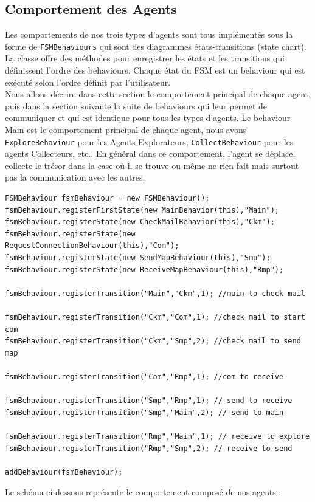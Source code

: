 \documentclass[10pt]{article}
\newcommand\tab[1][0.65cm]{\hspace*{#1}}
\begin{document}
	\subsection{Comportement des Agents}
	Les comportements de nos trois types d'agents sont tous implémentés sous la forme de \texttt{FSMBehaviours} qui sont des diagrammes états-transitions (state chart). La classe offre des méthodes pour enregistrer les états et les transitions qui définissent l'ordre des behaviours.	Chaque état du FSM est un behaviour qui est exécuté selon l'ordre définit par l'utilisateur.\\
	\tab Nous allons décrire dans cette section le comportement principal de chaque agent, puis dans la section suivante la suite de behaviours qui leur permet de communiquer et qui est identique pour tous les types d'agents. Le behaviour Main est le comportement principal de chaque agent, nous avons \texttt{ExploreBehaviour} pour les Agents Explorateurs, \texttt{CollectBehaviour} pour les agents Collecteurs, etc.. En général dans ce comportement, l'agent se déplace, collecte le trésor dans la case où il se trouve ou même ne rien fait mais surtout pas la communication avec les autres.

\begin{lstlisting}
FSMBehaviour fsmBehaviour = new FSMBehaviour();
fsmBehaviour.registerFirstState(new MainBehavior(this),"Main");
fsmBehaviour.registerState(new CheckMailBehavior(this),"Ckm");
fsmBehaviour.registerState(new RequestConnectionBehaviour(this),"Com");
fsmBehaviour.registerState(new SendMapBehaviour(this),"Smp");
fsmBehaviour.registerState(new ReceiveMapBehaviour(this),"Rmp");

fsmBehaviour.registerTransition("Main","Ckm",1); //main to check mail

fsmBehaviour.registerTransition("Ckm","Com",1); //check mail to start com
fsmBehaviour.registerTransition("Ckm","Smp",2); //check mail to send map

fsmBehaviour.registerTransition("Com","Rmp",1); //com to receive

fsmBehaviour.registerTransition("Smp","Rmp",1); // send to receive
fsmBehaviour.registerTransition("Smp","Main",2); // send to main

fsmBehaviour.registerTransition("Rmp","Main",1); // receive to explore
fsmBehaviour.registerTransition("Rmp","Smp",2); // receive to send

addBehaviour(fsmBehaviour);
\end{lstlisting}
Le schéma ci-dessous représente le comportement composé de nos agents :
\end{document}
